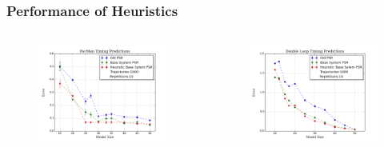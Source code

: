 \documentclass{beamer}
\begin{document}
\begin{frame}
\frametitle{Performance of Heuristics}

\begin{columns}[c]

\begin{figure}
\includegraphics[width=1.0\linewidth]{uCOREPICS/PacManTimingHeuristicsIncluded.png}
\end{figure}


\begin{figure}
\includegraphics[width=1.0\linewidth]{uCOREPICS/DoubleLoop47-27Heuristics.png}
\end{figure}


\end{columns}
\end{frame}
\end{document}
